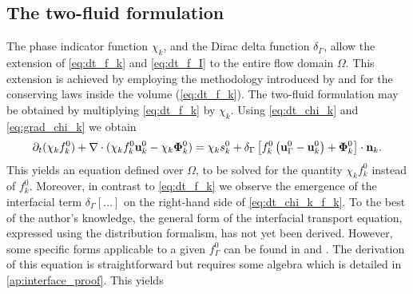 \subsection{The two-fluid formulation}
The phase indicator function $\chi_k$, and the Dirac delta function $\delta_\Gamma $, allow the extension of \ref{eq:dt_f_k} and \ref{eq:dt_f_I} to the entire flow domain $\Omega$. 
This extension is achieved by employing the methodology introduced by \citet{drew1983mathematical} and \citet{kataoka1986local} for the conserving laws inside the volume (\ref{eq:dt_f_k}).
The two-fluid formulation may be obtained by multiplying \ref{eq:dt_f_k} by $\chi_k$. 
Using \ref{eq:dt_chi_k} and \ref{eq:grad_chi_k} we obtain
\begin{equation}
    \pddt (\chi_k f_k^0)
    + \div (
        \chi_k f_k^0 \textbf{u}_k^0
        - \chi_k \mathbf{\Phi}_k^0 
        )
    = 
    \chi_k s_k^0
    + \delta_\Gamma \left[
        f_k^0
        \left(
            \textbf{u}_\Gamma^0
            - \textbf{u}_k^0
        \right)
        + \mathbf{\Phi}_k^0
    \right]
    \cdot \textbf{n}_k.
    \label{eq:dt_chi_k_f_k}
\end{equation}
This yields an equation defined over $\Omega$, to be solved for the quantity $\chi_k f_k^0$ instead of $f_k^0$. 
Moreover, in contrast to \ref{eq:dt_f_k} we observe the emergence of the interfacial term $ \delta_\Gamma [\ldots]$ on the right-hand side of \ref{eq:dt_chi_k_f_k}. 
To the best of the author's knowledge, the general form of the interfacial transport equation, expressed using the distribution formalism, has not yet been derived. However, some specific forms applicable to a given $f_\Gamma^0$ can be found in \citet{marle1982macroscopic} and  \citet{teigen2009}.
The derivation of this equation is straightforward but requires some algebra which is detailed in \ref{ap:interface_proof}. This yields%
